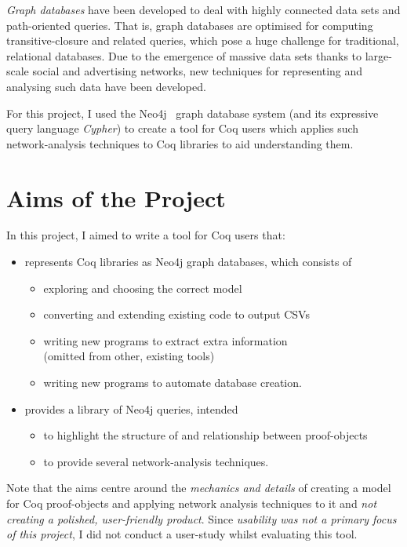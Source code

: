 \emph{Graph databases} have been developed to deal with highly connected data
sets and path-oriented queries. That is, graph databases are optimised for
computing transitive-closure and related queries, which pose a huge challenge
for traditional, relational databases. Due to the emergence of massive data
sets thanks to large-scale social and advertising networks, new techniques for
representing and analysing such data have been developed.

\newpage
For this project, I used the Neo4j~\cite{neo4j} graph database system (and its
expressive query language \emph{Cypher}) to create a tool for Coq users which
applies such network-analysis techniques to Coq libraries to aid understanding
them.

\section{Aims of the Project}\label{intro:aims}

In this project, I aimed to write a tool for Coq users that:

\begin{itemize}
\item represents Coq libraries as Neo4j graph databases, which consists of
  \begin{itemize}
  \item exploring and choosing the correct model
  \item converting and extending existing code to output CSVs
  \item writing new programs to extract extra information \\
      (omitted from other, existing tools)
  \item writing new programs to automate database creation.
  \end{itemize}

\item provides a library of Neo4j queries, intended
  \begin{itemize}
  \item to highlight the structure of and relationship between proof-objects
  \item to provide several network-analysis techniques.
  \end{itemize}
\end{itemize}

Note that the aims centre around the \emph{mechanics and details} of creating a
model for Coq proof-objects and applying network analysis techniques to it and
\emph{not creating a polished, user-friendly product}. Since \emph{usability was
not a \emph{primary} focus of this project}, I did not conduct a user-study whilst
evaluating this tool.

